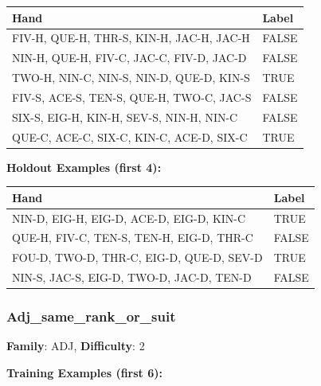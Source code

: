 \documentclass[10pt,a4paper]{article}
\begin{document}
\begin{small}
\begin{tabular}{p{8cm}l}
\toprule
Hand & Label \\
\midrule
FIV-H, QUE-H, THR-S, KIN-H, JAC-H, JAC-H & \textcolor{negative}{FALSE} \\
NIN-H, QUE-H, FIV-C, JAC-C, FIV-D, JAC-D & \textcolor{negative}{FALSE} \\
TWO-H, NIN-C, NIN-S, NIN-D, QUE-D, KIN-S & \textcolor{positive}{TRUE} \\
FIV-S, ACE-S, TEN-S, QUE-H, TWO-C, JAC-S & \textcolor{negative}{FALSE} \\
SIX-S, EIG-H, KIN-H, SEV-S, NIN-H, NIN-C & \textcolor{negative}{FALSE} \\
QUE-C, ACE-C, SIX-C, KIN-C, ACE-D, SIX-C & \textcolor{positive}{TRUE} \\
\bottomrule
\end{tabular}
\end{small}

\textbf{Holdout Examples (first 4):}

\begin{small}
\begin{tabular}{p{8cm}l}
\toprule
Hand & Label \\
\midrule
NIN-D, EIG-H, EIG-D, ACE-D, EIG-D, KIN-C & \textcolor{positive}{TRUE} \\
QUE-H, FIV-C, TEN-S, TEN-H, EIG-D, THR-C & \textcolor{negative}{FALSE} \\
FOU-D, TWO-D, THR-C, EIG-D, QUE-D, SEV-D & \textcolor{positive}{TRUE} \\
NIN-S, JAC-S, EIG-D, TWO-D, JAC-D, TEN-D & \textcolor{negative}{FALSE} \\
\bottomrule
\end{tabular}
\end{small}

\vspace{0.5cm}

\subsubsection{Adj\_same\_rank\_or\_suit}

\textbf{Family}: ADJ, \textbf{Difficulty}: 2

\textbf{Training Examples (first 6):}
\end{document}
